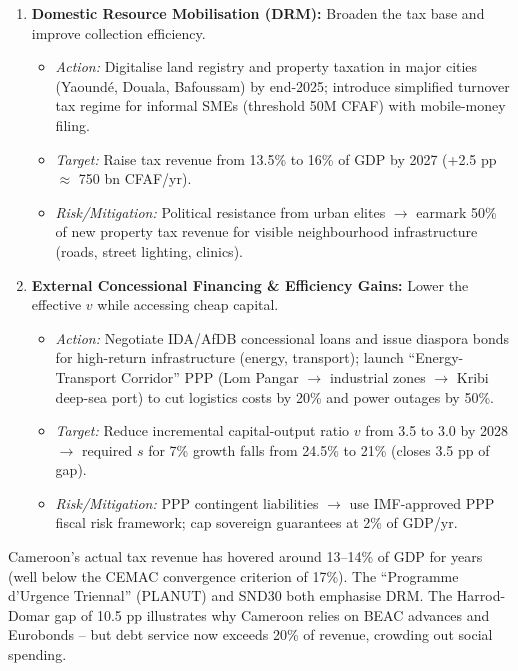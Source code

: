 \documentclass[11pt]{article}
\begin{document}
\begin{methode}
\begin{enumerate}
    \item \textbf{Domestic Resource Mobilisation (DRM):} Broaden the tax base and improve collection efficiency.
          \begin{itemize}
              \item \textit{Action:} Digitalise land registry and property taxation in major cities (Yaoundé, Douala, Bafoussam) by end-2025; introduce simplified turnover tax regime for informal SMEs (threshold 50M CFAF) with mobile-money filing.
              \item \textit{Target:} Raise tax revenue from 13.5\% to 16\% of GDP by 2027 (+2.5 pp $\approx$ 750 bn CFAF/yr).
              \item \textit{Risk/Mitigation:} Political resistance from urban elites $\rightarrow$ earmark 50\% of new property tax revenue for visible neighbourhood infrastructure (roads, street lighting, clinics).
          \end{itemize}
    \item \textbf{External Concessional Financing \& Efficiency Gains:} Lower the effective $v$ while accessing cheap capital.
          \begin{itemize}
              \item \textit{Action:} Negotiate IDA/AfDB concessional loans and issue diaspora bonds for high-return infrastructure (energy, transport); launch ``Energy-Transport Corridor'' PPP (Lom Pangar $\rightarrow$ industrial zones $\rightarrow$ Kribi deep-sea port) to cut logistics costs by 20\% and power outages by 50\%.
              \item \textit{Target:} Reduce incremental capital-output ratio $v$ from 3.5 to 3.0 by 2028 $\rightarrow$ required $s$ for 7\% growth falls from 24.5\% to 21\% (closes 3.5 pp of gap).
              \item \textit{Risk/Mitigation:} PPP contingent liabilities $\rightarrow$ use IMF-approved PPP fiscal risk framework; cap sovereign guarantees at 2\% of GDP/yr.
          \end{itemize}
\end{enumerate}
\end{methode}

\begin{savaistu}
Cameroon's actual tax revenue has hovered around 13--14\% of GDP for years (well below the CEMAC convergence criterion of 17\%). The ``Programme d'Urgence Triennal'' (PLANUT) and SND30 both emphasise DRM. The Harrod-Domar gap of 10.5 pp illustrates why Cameroon relies on BEAC advances and Eurobonds -- but debt service now exceeds 20\% of revenue, crowding out social spending.
\end{savaistu}
\end{document}
